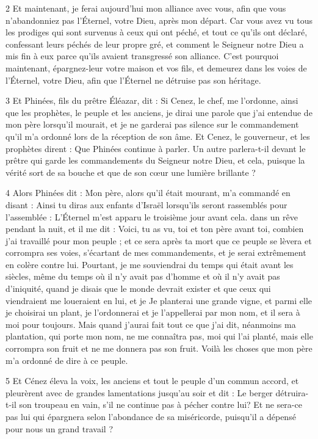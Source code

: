\par 2 Et maintenant, je ferai aujourd'hui mon alliance avec vous, afin que vous n'abandonniez pas l'Éternel, votre Dieu, après mon départ. Car vous avez vu tous les prodiges qui sont survenus à ceux qui ont péché, et tout ce qu'ils ont déclaré, confessant leurs péchés de leur propre gré, et comment le Seigneur notre Dieu a mis fin à eux parce qu'ils avaient transgressé son alliance. C'est pourquoi maintenant, épargnez-leur votre maison et vos fils, et demeurez dans les voies de l'Éternel, votre Dieu, afin que l'Éternel ne détruise pas son héritage.

\par 3 Et Phinées, fils du prêtre Éléazar, dit : Si Cenez, le chef, me l'ordonne, ainsi que les prophètes, le peuple et les anciens, je dirai une parole que j'ai entendue de mon père lorsqu'il mourait, et je ne garderai pas silence sur le commandement qu'il m'a ordonné lors de la réception de son âme. Et Cenez, le gouverneur, et les prophètes dirent : Que Phinées continue à parler. Un autre parlera-t-il devant le prêtre qui garde les commandements du Seigneur notre Dieu, et cela, puisque la vérité sort de sa bouche et que de son cœur une lumière brillante ?

\par 4 Alors Phinées dit : Mon père, alors qu'il était mourant, m'a commandé en disant : Ainsi tu diras aux enfants d'Israël lorsqu'ils seront rassemblés pour l'assemblée : L'Éternel m'est apparu le troisième jour avant cela. dans un rêve pendant la nuit, et il me dit : Voici, tu as vu, toi et ton père avant toi, combien j'ai travaillé pour mon peuple ; et ce sera après ta mort que ce peuple se lèvera et corrompra ses voies, s'écartant de mes commandements, et je serai extrêmement en colère contre lui. Pourtant, je me souviendrai du temps qui était avant les siècles, même du temps où il n'y avait pas d'homme et où il n'y avait pas d'iniquité, quand je disais que le monde devrait exister et que ceux qui viendraient me loueraient en lui, et je Je planterai une grande vigne, et parmi elle je choisirai un plant, je l'ordonnerai et je l'appellerai par mon nom, et il sera à moi pour toujours. Mais quand j'aurai fait tout ce que j'ai dit, néanmoins ma plantation, qui porte mon nom, ne me connaîtra pas, moi qui l'ai planté, mais elle corrompra son fruit et ne me donnera pas son fruit. Voilà les choses que mon père m'a ordonné de dire à ce peuple.

\par 5 Et Cénez éleva la voix, les anciens et tout le peuple d'un commun accord, et pleurèrent avec de grandes lamentations jusqu'au soir et dit : Le berger détruira-t-il son troupeau en vain, s'il ne continue pas à pécher contre lui? Et ne sera-ce pas lui qui épargnera selon l'abondance de sa miséricorde, puisqu'il a dépensé pour nous un grand travail ?

